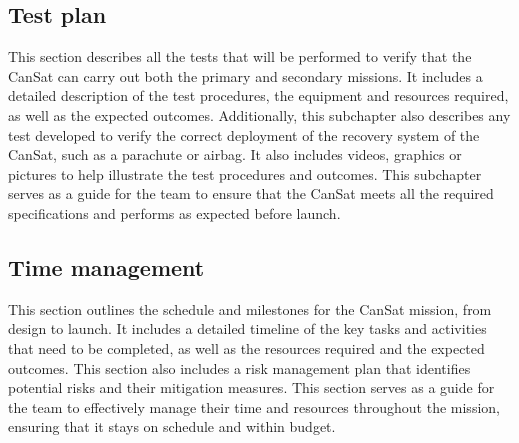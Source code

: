 \documentclass[11pt]{article}
\begin{document}

\subsection{Test plan}
This section describes all the tests that will be performed to verify that the CanSat can carry out both the primary and secondary missions. It includes a detailed description of the test procedures, the equipment and resources required, as well as the expected outcomes. Additionally, this subchapter also describes any test developed to verify the correct deployment of the recovery system of the CanSat, such as a parachute or airbag. It also includes videos, graphics or pictures to help illustrate the test procedures and outcomes. This subchapter serves as a guide for the team to ensure that the CanSat meets all the required specifications and performs as expected before launch.

\subsection{Time management}
This section outlines the schedule and milestones for the CanSat mission, from design to launch. It includes a detailed timeline of the key tasks and activities that need to be completed, as well as the resources required and the expected outcomes. This section also includes a risk management plan that identifies potential risks and their mitigation measures. This section serves as a guide for the team to effectively manage their time and resources throughout the mission, ensuring that it stays on schedule and within budget.
\end{document}
